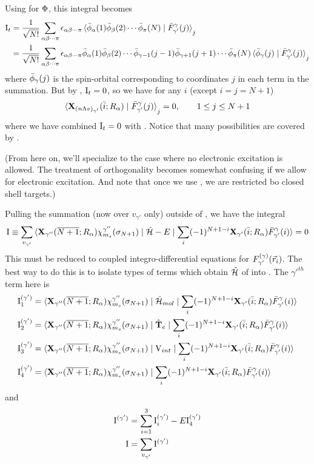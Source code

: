 \documentclass[aps,pra,groupedaddress,12pt,
               amsfonts,amssymb,
               preprint
    ]{revtex4}
\begin{document}
Using  for $\Phi$, this integral becomes
\begin{align*}
  \mathrm{I}_t &=
  \dfrac{1}{\sqrt{N!}}\sum_{\alpha\beta\cdots\pi}\epsilon_{\alpha\beta\cdots\pi}
  \mathinner{\langle{{\bar{\phi}_\alpha(1)\bar{\phi}_\beta(2)\cdots\bar{\phi}_\pi(N)} \mid {\bar{F}_{\gamma'}^{\gamma}(j)}}\rangle}_j \\
    &=\dfrac{1}{\sqrt{N!}}\sum_{\alpha\beta\cdots\pi}\epsilon_{\alpha\beta\cdots\pi}
      \bar{\phi}_\alpha(1)\bar{\phi}_\beta(2)\cdots\bar{\phi}_{\gamma-1}(j-1)\bar{\phi}_{\gamma+1}(j+1)
      \cdots\bar{\phi}_\pi(N)\mathinner{\langle{{\bar{\phi}_\gamma(j)} \mid {\bar{F}_{\gamma'}^{\gamma}(j)}}\rangle}_j 
\end{align*}
where $\bar{\phi}_\gamma(j)$ is the spin-orbital corresponding to coordinates
$j$ in each term in the summation. But by , $\mathrm{I}_t=0$, so we have
for any $i$ (except $i=j=N+1$)
\begin{equation}
  \label{eq:otem2}
  \mathinner{\langle{{\mathbf{X}_{(n\Lambda v)_{\gamma'}}(\bar{i};R_\alpha)} \mid {\bar{F}_{\gamma'}^{\gamma}(j)}}\rangle}_j = 0,
  \qquad 1\leq j \leq N+1
\end{equation}
where we have combined $\mathrm{I}_t=0$ with . Notice that many
possibilities are covered by . 

(From here on, we'll specialize to the case where no electronic
excitation is allowed. The treatment of orthogonality becomes somewhat
confusing if we allow for electronic excitation. And note that once we
use , we are restricted bo closed shell
targets.\label{com:state}) 

Pulling the summation (now over $v_{\gamma'}$ only) outside of
, we have the integral
\begin{equation}
  \label{eq:int3}
  \mathrm{I}\equiv\sum_{v_{\gamma'}}\mathinner{\langle{{\mathbf{X}_{\gamma''}(\overline{N+1};R_\alpha)\chi_{m_s}^{\gamma''}(\sigma_{N+1})} \mid {\hat{\mathcal{H}}- E} \mid {\sum_i(-1)^{N+1-i}\mathbf{X}_{\gamma'}(\bar{i};R_\alpha)\bar{F}_{\gamma'}^{\gamma}(i)}}\rangle} = 0
\end{equation}
This must be reduced to coupled integro-differential equations for
$F_{\gamma'}^{(\gamma)}(\vec{r}_{i})$. The best way to do this is to isolate types of terms which
obtain $\hat{\mathcal{H}}$ of  into . The $\gamma'^{th}$ term here
is
\begin{subequations}
  \begin{align}
  \mathrm{I}_1^{(\gamma')} &=
  \mathinner{\langle{{\mathbf{X}_{\gamma''}(\overline{N+1};R_\alpha)\chi_{m_s}^{\gamma''}(\sigma_{N+1})} \mid {\hat{\mathcal{H}}_{mol}} \mid {\sum_i(-1)^{N+1-i}\mathbf{X}_{\gamma'}(\bar{i};R_\alpha)\bar{F}_{\gamma'}^{\gamma}(i)}}\rangle} \\
  \mathrm{I}_2^{(\gamma')} &=
  \mathinner{\langle{{\mathbf{X}_{\gamma''}(\overline{N+1};R_\alpha)\chi_{m_s}^{\gamma''}(\sigma_{N+1})} \mid {\hat{\mathbf{T}}_e} \mid {\sum_i(-1)^{N+1-i}\mathbf{X}_{\gamma'}(\bar{i};R_\alpha)\bar{F}_{\gamma'}^{\gamma}(i)}}\rangle} \\
  \mathrm{I}_3^{(\gamma')} &=
  \mathinner{\langle{{\mathbf{X}_{\gamma''}(\overline{N+1};R_\alpha)\chi_{m_s}^{\gamma''}(\sigma_{N+1})} \mid {\mathrm{V}_{int}} \mid {\sum_i(-1)^{N+1-i}\mathbf{X}_{\gamma'}(\bar{i};R_\alpha)\bar{F}_{\gamma'}^{\gamma}(i)}}\rangle} \\
  \mathrm{I}_4^{(\gamma')} &=
  \mathinner{\langle{{\mathbf{X}_{\gamma''}(\overline{N+1};R_\alpha)\chi_{m_s}^{\gamma''}(\sigma_{N+1})} \mid {\sum_i(-1)^{N+1-i}\mathbf{X}_{\gamma'}(\bar{i};R_\alpha)\bar{F}_{\gamma'}^{\gamma}(i)}}\rangle}
  \end{align}
\end{subequations}
and
\begin{align*}
  \mathrm{I}^{(\gamma')} &= \sum_{i=1}^{3}\mathrm{I}_i^{(\gamma')} - E\mathrm{I}_4^{(\gamma')} \\
  \mathrm{I} &= \sum_{v_{\gamma'}}\mathrm{I}^{(\gamma')}
\end{align*}
\end{document}

